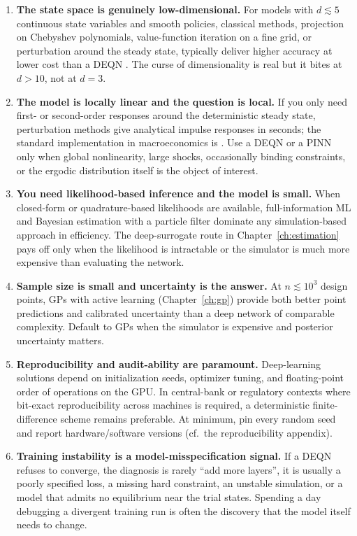 \documentclass[11pt,a4paper]{report}
\begin{document}
\begin{enumerate}[itemsep=4pt]
\item \textbf{The state space is genuinely low-dimensional.}  For models with $d \lesssim 5$ continuous state variables and smooth policies, classical methods, projection on Chebyshev polynomials, value-function iteration on a fine grid, or perturbation around the steady state, typically deliver higher accuracy at lower cost than a DEQN \citep{judd1998numerical}.  The curse of dimensionality is real but it bites at $d > 10$, not at $d = 3$.

\item \textbf{The model is locally linear and the question is local.}  If you only need first- or second-order responses around the deterministic steady state, perturbation methods give analytical impulse responses in seconds; the standard implementation in macroeconomics is \citet{adjemian2024dynare}.  Use a DEQN or a PINN only when global nonlinearity, large shocks, occasionally binding constraints, or the ergodic distribution itself is the object of interest.

\item \textbf{You need likelihood-based inference and the model is small.}  When closed-form or quadrature-based likelihoods are available, full-information ML and Bayesian estimation with a particle filter dominate any simulation-based approach in efficiency.  The deep-surrogate route in Chapter~\ref{ch:estimation} pays off only when the likelihood is intractable or the simulator is much more expensive than evaluating the network.

\item \textbf{Sample size is small and uncertainty is the answer.}  At $n \lesssim 10^3$ design points, GPs with active learning (Chapter~\ref{ch:gp}) provide both better point predictions and calibrated uncertainty than a deep network of comparable complexity.  Default to GPs when the simulator is expensive and posterior uncertainty matters.

\item \textbf{Reproducibility and audit-ability are paramount.}  Deep-learning solutions depend on initialization seeds, optimizer tuning, and floating-point order of operations on the GPU.  In central-bank or regulatory contexts where bit-exact reproducibility across machines is required, a deterministic finite-difference scheme remains preferable.  At minimum, pin every random seed and report hardware/software versions (cf.\ the reproducibility appendix).

\item \textbf{Training instability is a model-misspecification signal.}  If a DEQN refuses to converge, the diagnosis is rarely ``add more layers'', it is usually a poorly specified loss, a missing hard constraint, an unstable simulation, or a model that admits no equilibrium near the trial states.  Spending a day debugging a divergent training run is often the discovery that the model itself needs to change.
\end{enumerate}
\end{document}
